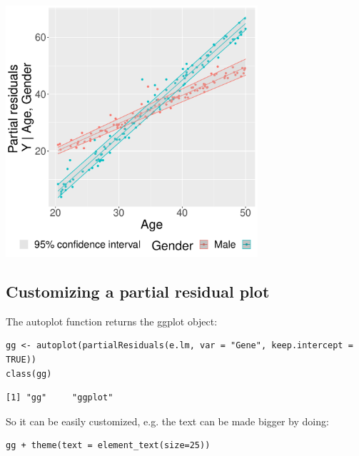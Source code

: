 \documentclass[12pt]{article}
\begin{document}
\begin{center}
\includegraphics[width=0.7\textwidth]{./figures/fig-butils-plotConf-interaction.pdf}
\end{center}

\clearpage

\subsection{Customizing a partial residual plot}
\label{sec:org5e93def}

The autoplot function returns the ggplot object:
\lstset{language=r,label= ,caption= ,captionpos=b,numbers=none}
\begin{lstlisting}
gg <- autoplot(partialResiduals(e.lm, var = "Gene", keep.intercept = TRUE))
class(gg)
\end{lstlisting}

\begin{verbatim}
[1] "gg"     "ggplot"
\end{verbatim}

So it can be easily customized, e.g. the text can be made bigger by
doing:
\lstset{language=r,label= ,caption= ,captionpos=b,numbers=none}
\begin{lstlisting}
gg + theme(text = element_text(size=25))
\end{lstlisting}
\end{document}
